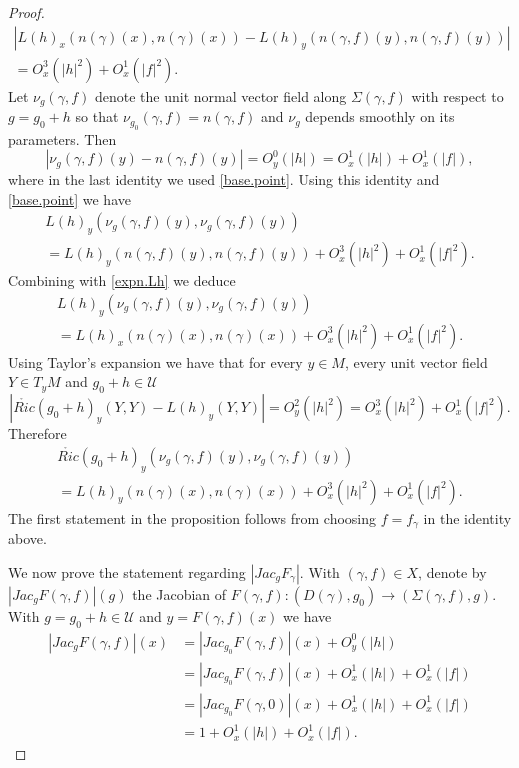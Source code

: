\documentclass[10pt,a4paper]{amsart}
\begin{document}
\begin{proof}
\begin{multline}
			|L(h)_x(n(\gamma)(x),n(\gamma)(x))-L(h)_y(n(\gamma,f)(y),n(\gamma,f)(y))|\\
			=O_x^3(|h|^2)+ O_x^1(|f|^2).
		\end{multline}
		Let $\nu_g(\gamma,f)$ denote the unit normal vector field along $\Sigma(\gamma,f)$ with respect to $g=g_0+h$ so that $\nu_{g_0}(\gamma,f)=n(\gamma,f)$ and $\nu_g$ depends smoothly on its parameters. Then
		$$|\nu_g(\gamma,f)(y)-n(\gamma,f)(y)|=O_y^0(|h|)=O_x^1(|h|)+ O_x^1(|f|),$$
		where in the last identity we used \eqref{base.point}. Using this identity and \eqref{base.point}  we have
		\begin{multline*}
			L(h)_y(\nu_g(\gamma,f)(y),\nu_g(\gamma,f)(y))\\
			=L(h)_y(n(\gamma,f)(y),n(\gamma,f)(y))+O_x^3(|h|^2)+ O_x^1(|f|^2).
		\end{multline*}
		Combining with \eqref{expn.Lh} we deduce
		\begin{multline*}
			L(h)_y(\nu_g(\gamma,f)(y),\nu_g(\gamma,f)(y))\\
			=L(h)_x(n(\gamma)(x),n(\gamma)(x))+O_x^3(|h|^2)+ O_x^1(|f|^2).
		\end{multline*}
		Using Taylor's expansion  we have  that for every $y\in M$, every unit vector field $Y\in T_yM$ and $g_0+h\in \mathcal U$
		$$|\mathring{Ric}(g_0+h)_y(Y,Y)-L(h)_y(Y,Y)|=O_y^2(|h|^2)=O_x^3(|h|^2)+O_x^1(|f|^2).$$
		Therefore
		\begin{multline*}
			\mathring{Ric}(g_0+h)_y(\nu_g(\gamma,f)(y),\nu_g(\gamma,f)(y))\\
			=L(h)_y(n(\gamma)(x),n(\gamma)(x))+O_x^3(|h|^2)+ O_x^1(|f|^2).
		\end{multline*}
		The first statement in the proposition follows from choosing $f=f_\gamma$ in the identity above.
		
		We now prove the statement regarding $|Jac_g F_{\gamma}|$. With $(\gamma,f)\in X$,  denote by $|Jac_g F(\gamma,f)|(g)$ the Jacobian of $F(\gamma,f):(D(\gamma),g_0)\rightarrow (\Sigma(\gamma,f),g)$. With $g=g_0+h\in \mathcal U$ and $y=F(\gamma,f)(x)$ we have
		\begin{align*}
			|Jac_g F(\gamma,f)|(x) & =|Jac_{g_0}F(\gamma,f)|(x)+ O^0_y(|h|)\\
			&=|Jac_{g_0}F(\gamma,f)|(x)+ O^1_x(|h|)+O^1_x(|f|)\\
			&=|Jac_{g_0}F(\gamma,0)|(x)+O^1_x(|h|)+O^1_x(|f|)\\
			&=1+O^1_x(|h|)+O^1_x(|f|).
		\end{align*}
		
		
	\end{proof}
\end{document}
